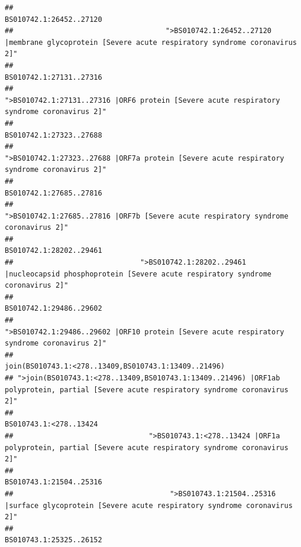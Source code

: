\documentclass[
]{article}
\begin{document}
\begin{verbatim}
##                                                                                                                BS010742.1:26452..27120 
##                                    ">BS010742.1:26452..27120 |membrane glycoprotein [Severe acute respiratory syndrome coronavirus 2]" 
##                                                                                                                BS010742.1:27131..27316 
##                                             ">BS010742.1:27131..27316 |ORF6 protein [Severe acute respiratory syndrome coronavirus 2]" 
##                                                                                                                BS010742.1:27323..27688 
##                                            ">BS010742.1:27323..27688 |ORF7a protein [Severe acute respiratory syndrome coronavirus 2]" 
##                                                                                                                BS010742.1:27685..27816 
##                                                    ">BS010742.1:27685..27816 |ORF7b [Severe acute respiratory syndrome coronavirus 2]" 
##                                                                                                                BS010742.1:28202..29461 
##                              ">BS010742.1:28202..29461 |nucleocapsid phosphoprotein [Severe acute respiratory syndrome coronavirus 2]" 
##                                                                                                                BS010742.1:29486..29602 
##                                            ">BS010742.1:29486..29602 |ORF10 protein [Severe acute respiratory syndrome coronavirus 2]" 
##                                                                                   join(BS010743.1:<278..13409,BS010743.1:13409..21496) 
## ">join(BS010743.1:<278..13409,BS010743.1:13409..21496) |ORF1ab polyprotein, partial [Severe acute respiratory syndrome coronavirus 2]" 
##                                                                                                                 BS010743.1:<278..13424 
##                                ">BS010743.1:<278..13424 |ORF1a polyprotein, partial [Severe acute respiratory syndrome coronavirus 2]" 
##                                                                                                                BS010743.1:21504..25316 
##                                     ">BS010743.1:21504..25316 |surface glycoprotein [Severe acute respiratory syndrome coronavirus 2]" 
##                                                                                                                BS010743.1:25325..26152 

\end{verbatim}
\end{document}
